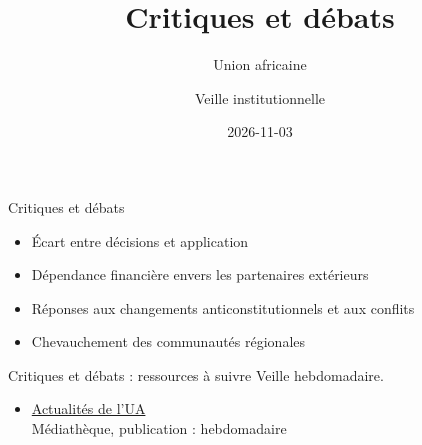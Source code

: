 \documentclass[aspectratio=169,11pt]{beamer}
\title{Critiques et débats}
\subtitle{Union africaine}
\author{Veille institutionnelle}
\date{2026-11-03}
\begin{document}
\begin{frame}\titlepage\end{frame}

\begin{frame}{Critiques et débats}
\begin{itemize}
\item Écart entre décisions et application
\item Dépendance financière envers les partenaires extérieurs
\item Réponses aux changements anticonstitutionnels et aux conflits
\item Chevauchement des communautés régionales
\end{itemize}
\end{frame}

\begin{frame}{Critiques et débats : ressources à suivre}
\small
Veille hebdomadaire.
\begin{itemize}
\item \href{https://au.int/en/pressreleases}{Actualités de l'UA}\\{\footnotesize Médiathèque, publication : hebdomadaire}
\end{itemize}
\end{frame}
\end{document}
